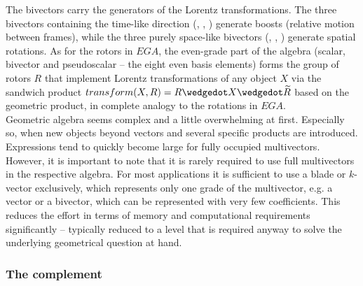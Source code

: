 The bivectors carry the generators of the Lorentz transformations. The three bivectors
containing the time-like direction (, , ) generate boosts (relative
motion between frames), while the three purely space-like bivectors (, ,
) generate spatial rotations. As for the rotors in $EGA$, the even-grade part of
the algebra (scalar, bivector and pseudoscalar -- the eight even basis elements) forms the
group of rotors $R$ that implement Lorentz transformations of any object $X$ via the
sandwich product $transform(X,R) = R \wedgedot X \wedgedot \rev{R}$ based on the geometric
product, in complete analogy to the rotations in $EGA$. \\

Geometric algebra seems complex and a little overwhelming at first. Especially so, when
new objects beyond vectors and several specific products are introduced.
Expressions tend to quickly become large for fully occupied multivectors. However,
it is important to note that it is rarely required to use full multivectors in the
respective algebra. For most applications it is sufficient to use a blade or $k$-vector
exclusively, which represents only one grade of the multivector, e.g. a vector or a
bivector, which can be represented with very few coefficients. This reduces the effort in
terms of memory and computational requirements significantly -- typically reduced to a
level that is required anyway to solve the underlying geometrical question at hand.


\subsubsection{The complement}
\label{subsection:complement}

